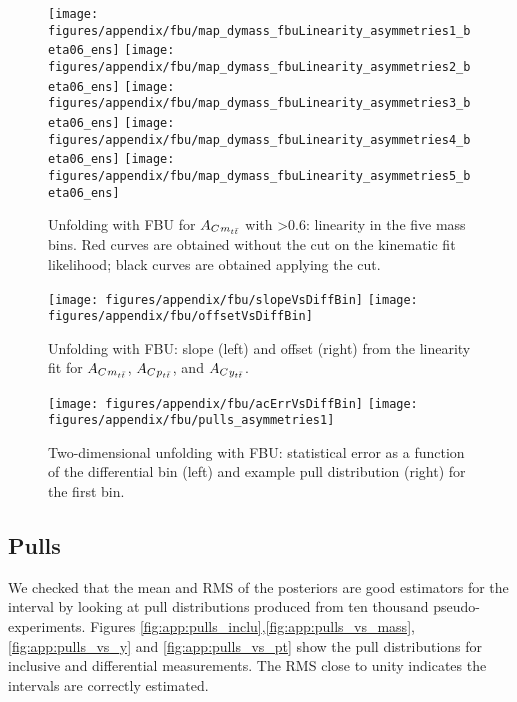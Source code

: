 %
\begin{figure}
  \begin{center}
  \texttt{[image: figures/appendix/fbu/map\_dymass\_fbuLinearity\_asymmetries1\_beta06\_ens]}
  \texttt{[image: figures/appendix/fbu/map\_dymass\_fbuLinearity\_asymmetries2\_beta06\_ens]}
  \texttt{[image: figures/appendix/fbu/map\_dymass\_fbuLinearity\_asymmetries3\_beta06\_ens]}
  \texttt{[image: figures/appendix/fbu/map\_dymass\_fbuLinearity\_asymmetries4\_beta06\_ens]}
  \texttt{[image: figures/appendix/fbu/map\_dymass\_fbuLinearity\_asymmetries5\_beta06\_ens]}
  \caption{
    \label{fig:app:fbuLinACmttbeta06}
    Unfolding with FBU for $A_C{}_{m_{t\bar{t}}{}}$ with \betatt\textgreater0.6: linearity in the five
    \ttbar{} mass bins. Red curves are obtained
    without the cut on the kinematic fit likelihood; black curves are
    obtained applying the cut.
  }
  \end{center}
\end{figure}
%
\begin{figure}
  \begin{center}
  \texttt{[image: figures/appendix/fbu/slopeVsDiffBin]}
  \texttt{[image: figures/appendix/fbu/offsetVsDiffBin]}
  \caption{
    \label{fig:app:fbuLinSlopeOffset}
    Unfolding with FBU: slope (left) and offset (right) from the
    linearity fit for $A_C{}_{m_{t\bar{t}}{}}$, $A_C{}_{p_{t\bar{t}}{}}$, and $A_C{}_{y_{t\bar{t}}{}}$.
    }
  \end{center}
\end{figure}
%
\begin{figure}
  \begin{center}
  \texttt{[image: figures/appendix/fbu/acErrVsDiffBin]}
  \texttt{[image: figures/appendix/fbu/pulls\_asymmetries1]}
  \caption{
    \label{fig:app:fbuErrLhoodCut}
    Two-dimensional unfolding with FBU: \ac{} statistical error as a
    function of the differential bin (left) and example pull
    distribution (right) for the first \mtt{} bin.
  }
  \end{center}
\end{figure}
\clearpage


\subsection{Pulls}
We checked that the mean and RMS of the \ac{} posteriors are good estimators for the \ac{} interval by
looking at pull distributions produced from ten thousand pseudo-experiments.
Figures \ref{fig:app:pulls_inclu},\ref{fig:app:pulls_vs_mass},\ref{fig:app:pulls_vs_y} and \ref{fig:app:pulls_vs_pt} show
the pull distributions for inclusive and differential measurements.
The RMS close to unity indicates the intervals are correctly estimated.

